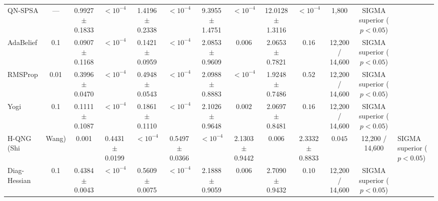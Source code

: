 \begin{table}[t]
\begin{tabular}{lccccccccccc}
QN-SPSA & --- & 0.9927 $\pm$ 0.1833 & $< 10^{-4}$ & 1.4196 $\pm$ 0.2338 & $< 10^{-4}$ & 9.3955 $\pm$ 1.4751 & $< 10^{-4}$ & 12.0128 $\pm$ 1.3116 & $< 10^{-4}$ & 1,800 & SIGMA superior ($p<0.05$) \\
AdaBelief & 0.1 & 0.0907 $\pm$ 0.1168 & $< 10^{-4}$ & 0.1421 $\pm$ 0.0959 & $< 10^{-4}$ & 2.0853 $\pm$ 0.9609 & $0.006$ & 2.0653 $\pm$ 0.7821 & $0.16$ & 12,200 / 14,600 & SIGMA superior ($p<0.05$) \\
RMSProp & 0.01 & 0.3996 $\pm$ 0.0470 & $< 10^{-4}$ & 0.4948 $\pm$ 0.0543 & $< 10^{-4}$ & 2.0988 $\pm$ 0.8883 & $< 10^{-4}$ & 1.9248 $\pm$ 0.7486 & $0.52$ & 12,200 / 14,600 & SIGMA superior ($p<0.05$) \\
Yogi & 0.1 & 0.1111 $\pm$ 0.1087 & $< 10^{-4}$ & 0.1861 $\pm$ 0.1110 & $< 10^{-4}$ & 2.1026 $\pm$ 0.9648 & $0.002$ & 2.0697 $\pm$ 0.8481 & $0.16$ & 12,200 / 14,600 & SIGMA superior ($p<0.05$) \\
H-QNG (Shi&Wang) & 0.001 & 0.4431 $\pm$ 0.0199 & $< 10^{-4}$ & 0.5497 $\pm$ 0.0366 & $< 10^{-4}$ & 2.1303 $\pm$ 0.9442 & $0.006$ & 2.3332 $\pm$ 0.8833 & $0.045$ & 12,200 / 14,600 & SIGMA superior ($p<0.05$) \\
Diag-Hessian & 0.1 & 0.4384 $\pm$ 0.0043 & $< 10^{-4}$ & 0.5609 $\pm$ 0.0075 & $< 10^{-4}$ & 2.1888 $\pm$ 0.9059 & $0.006$ & 2.7090 $\pm$ 0.9432 & $0.10$ & 12,200 / 14,600 & SIGMA superior ($p<0.05$) \\
\bottomrule
\end{tabular}
\end{table}
